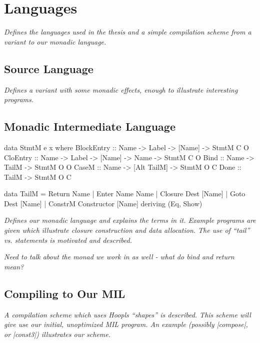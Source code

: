 \documentclass[12pt]{report}
\begin{document}
           {\doublespacing}{}
           \chapter{Languages}

\emph{Defines the languages used in the thesis and a simple
  compilation scheme from a \lamA variant to our monadic language. }

\section{Source Language}

\emph{Defines a \lamA variant with some monadic effects, enough to
  illustrate interesting programs.}

\section{Monadic Intermediate Language}



\begin{code}
data StmtM e x where
  BlockEntry :: Name -> Label -> [Name] -> StmtM C O
  CloEntry :: Name -> Label -> [Name] -> Name -> StmtM C O
  Bind :: Name -> TailM -> StmtM O O
  CaseM :: Name -> [Alt TailM] -> StmtM O C
  Done :: TailM -> StmtM O C

data TailM = Return Name 
  | Enter Name Name
  | Closure Dest [Name]
  | Goto Dest [Name] 
  | ConstrM Constructor [Name]
  deriving (Eq, Show)
\end{code}

\emph{Defines our monadic language and explains the terms in
  it. Example programs are given which illustrate closure construction
  and data allocation. The use of ``tail'' vs. statements is motivated
  and described. }

\emph{Need to talk about the monad we work in as well - what 
do bind and return mean?}

\section{Compiling to Our MIL}
\emph{A compilation scheme which uses Hoopls ``shapes'' is
described. This scheme will give use our initial, unoptimized
MIL program. An example (possibly |compose|, or |const3|) illustrates 
our scheme.}
\end{document}
